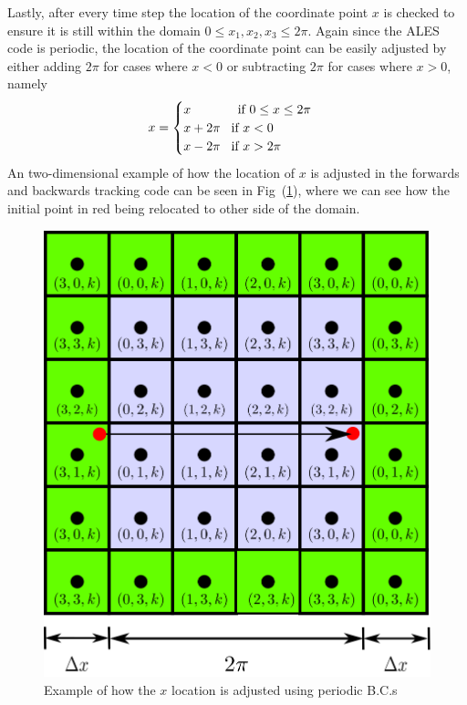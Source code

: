 Lastly, after every time step the location of the coordinate point $x$ is
checked to ensure it is still within the domain $0 \leq x_{1}, x_{2}, x_{3}
\leq 2\pi$. Again since the ALES code is periodic, the location of the
coordinate point can be easily adjusted by either adding $2\pi$ for cases
where $x<0$ or subtracting $2\pi$ for cases where $x>0$, namely
\begin{equation}
    x = 
    \begin{cases}
        x           \text{\hspace{1.3cm}if $ 0 \leq x \leq 2\pi$}  \\
        x + 2\pi    \text{\hspace{0.3cm}if $ x < 0$}  \\
        x - 2\pi    \text{\hspace{0.3cm}if $ x > 2\pi$}     \\
    \end{cases}
\end{equation}
An two-dimensional example of how the location of $x$ is adjusted in the
forwards and backwards tracking code can be seen in
Fig~(\ref{fig:location-adjustment}), where we can see how the initial point
in red being relocated to other side of the domain.
\begin{figure}[H]
    \includegraphics[height=0.35\textheight]{media/rk4/location-adjustment}
    \caption{Example of how the $x$ location is adjusted using periodic B.C.s}
    \label{fig:location-adjustment}
\end{figure}

